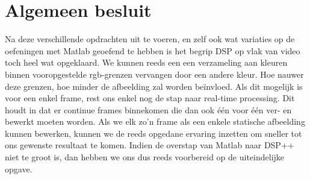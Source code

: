  \chapter{Algemeen besluit}
 
\par Na deze verschillende opdrachten uit te voeren, en zelf ook wat variaties op de oefeningen met Matlab geoefend te hebben is het begrip DSP op vlak van video toch heel wat opgeklaard.
We kunnen reeds een een verzameling aan kleuren binnen vooropgestelde rgb-grenzen vervangen door een andere kleur. Hoe nauwer deze grenzen, hoe minder de afbeelding zal worden be\"invloed. 
Als dit mogelijk is voor een enkel frame, rest ons enkel nog de stap naar real-time processing.
Dit houdt in dat er continue frames binnekomen die dan ook \'e\'en voor \'e\'en ver- en bewerkt moeten worden.
Als we elk zo'n frame als een enkele statische afbeelding kunnen bewerken, kunnen we de reeds opgedane ervaring inzetten om sneller tot ons gewenste resultaat te komen.
Indien de overstap van Matlab naar DSP++ niet te groot is, dan hebben we ons dus reeds voorbereid op de uiteindelijke opgave.